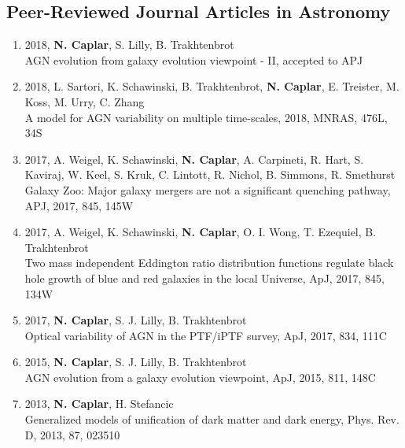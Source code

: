 \documentclass[11pt,letterpaper]{article}
\begin{document}

\subsection*{Peer-Reviewed Journal Articles in Astronomy}

\begin{enumerate}

\item 2018, \textbf{N. Caplar}, S. Lilly, B. Trakhtenbrot\\
AGN evolution from galaxy evolution viewpoint - II, accepted to APJ

\item 2018, L. Sartori, K. Schawinski, B. Trakhtenbrot, \textbf{N. Caplar}, E. Treister, M. Koss, M. Urry, C. Zhang \\
A model for AGN variability on multiple time-scales, 2018, MNRAS, 476L, 34S

\item 2017, A. Weigel, K. Schawinski,  \textbf{N. Caplar}, A. Carpineti, R. Hart, S. Kaviraj, W. Keel, S. Kruk, C. Lintott, R. Nichol, B. Simmons, R. Smethurst
\\    Galaxy Zoo:  Major galaxy mergers are not a significant quenching pathway, APJ, 2017, 845, 145W \\

\item 2017, A. Weigel, K. Schawinski,  \textbf{N. Caplar}, O. I. Wong, T. Ezequiel, B. Trakhtenbrot
\\    Two mass independent Eddington ratio distribution functions regulate black hole growth of blue and red 
galaxies in the local Universe, ApJ, 2017, 845, 134W \\

\item 2017,  \textbf{N. Caplar}, S. J. Lilly, B. Trakhtenbrot   \\Optical variability of AGN in the PTF/iPTF survey, ApJ, 2017, 834, 111C   \\
 
\item 2015,  \textbf{N. Caplar}, S. J. Lilly, B. Trakhtenbrot  \\AGN evolution from a galaxy evolution viewpoint, ApJ,  2015, 811, 148C \\
  
 \item 2013,  \textbf{N. Caplar}, H. Stefancic  \\ Generalized models of unification of dark matter and dark energy, Phys. Rev. D, 2013, 87, 023510 
\end{enumerate}
\end{document}
